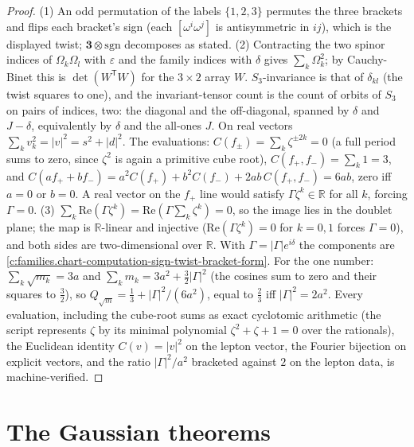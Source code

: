 \documentclass[11pt]{article}
\theoremstyle{definition}
\theoremstyle{plain}
\providecommand{\R}{}\renewcommand{\R}{\mathbb{R}}
\begin{document}
\begin{proof}
(1) An odd permutation of the labels $\{1,2,3\}$ permutes the three brackets and flips each bracket's sign (each $[\omega^{i}\omega^{j}]$ is antisymmetric in $ij$), which is the displayed twist; $\mathbf{3} \otimes \mathrm{sgn}$ decomposes as stated. (2) Contracting the two spinor indices of $\Omega_{k}\Omega_{l}$ with $\varepsilon$ and the family indices with $\delta$ gives $\sum_{k}\Omega_{k}^{2}$; by Cauchy-Binet this is $\det(W^{\mathsf{T}}W)$ for the $3 \times 2$ array $W$. $S_{3}$-invariance is that of $\delta_{kl}$ (the twist squares to one), and the invariant-tensor count is the count of orbits of $S_{3}$ on pairs of indices, two: the diagonal and the off-diagonal, spanned by $\delta$ and $J - \delta$, equivalently by $\delta$ and the all-ones $J$. On real vectors $\sum_{k}v_{k}^{2} = |v|^{2} = s^{2} + |d|^{2}$. The evaluations: $C(f_{\pm}) = \sum_{k}\zeta^{\pm 2k} = 0$ (a full period sums to zero, since $\zeta^{2}$ is again a primitive cube root), $C(f_{+}, f_{-}) = \sum_{k}1 = 3$, and $C(af_{+} + bf_{-}) = a^{2}C(f_{+}) + b^{2}C(f_{-}) + 2ab\,C(f_{+}, f_{-}) = 6ab$, zero iff $a = 0$ or $b = 0$. A real vector on the $f_{+}$ line would satisfy $\Gamma\zeta^{k} \in \R$ for all $k$, forcing $\Gamma = 0$. (3) $\sum_{k}\mathrm{Re}(\Gamma\zeta^{k}) = \mathrm{Re}(\Gamma\sum_{k}\zeta^{k}) = 0$, so the image lies in the doublet plane; the map is $\R$-linear and injective ($\mathrm{Re}(\Gamma\zeta^{k}) = 0$ for $k = 0, 1$ forces $\Gamma = 0$), and both sides are two-dimensional over $\R$. With $\Gamma = |\Gamma|e^{i\delta}$ the components are \ref{c:families.chart-computation-sign-twist-bracket-form}. For the one number: $\sum_{k}\sqrt{m_{k}} = 3a$ and $\sum_{k}m_{k} = 3a^{2} + \tfrac32|\Gamma|^{2}$ (the cosines sum to zero and their squares to $\tfrac32$), so $Q_{\sqrt{m}} = \tfrac13 + |\Gamma|^{2}/(6a^{2})$, equal to $\tfrac23$ iff $|\Gamma|^{2} = 2a^{2}$. Every evaluation, including the cube-root sums as exact cyclotomic arithmetic (the script represents $\zeta$ by its minimal polynomial $\zeta^{2} + \zeta + 1 = 0$ over the rationals), the Euclidean identity $C(v) = |v|^{2}$ on the lepton vector, the Fourier bijection on explicit vectors, and the ratio $|\Gamma|^{2}/a^{2}$ bracketed against $2$ on the lepton data, is machine-verified.

\end{proof}

\section{The Gaussian theorems}
\end{document}
